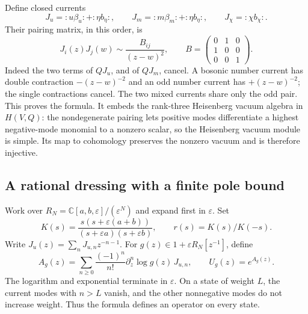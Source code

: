 Define closed currents
\[
 J_u={:}u\beta_u{:}+{:}\eta b_\eta{:},\qquad
 J_m={:}m\beta_m{:}+{:}\eta b_\eta{:},\qquad
 J_\chi={:}\chi b_\chi{:}.
\]
Their pairing matrix, in this order, is
\begin{equation}\label{cyquant:eq:nodal-current-pairing}
 J_i(z)J_j(w)\sim\frac{B_{ij}}{(z-w)^2},\qquad
 B=\begin{pmatrix}0&1&0\\1&0&0\\0&0&1\end{pmatrix}.
\end{equation}
Indeed the two terms of $QJ_u$, and of $QJ_m$, cancel.  A bosonic
number current has double contraction $-(z-w)^{-2}$ and an odd number
current has $+(z-w)^{-2}$; the single contractions cancel.  The two
mixed currents share only the odd pair.  This proves the formula.
It embeds the rank-three Heisenberg vacuum algebra in $H(V,Q)$:
the nondegenerate pairing lets positive modes differentiate a highest
negative-mode monomial to a nonzero scalar, so the Heisenberg vacuum
module is simple.  Its map to cohomology preserves the nonzero vacuum
and is therefore injective.

\subsection{A rational dressing with a finite pole bound}

Work over $R_N=\mathbb C[a,b,\varepsilon]/(\varepsilon^N)$ and expand
first in $\varepsilon$.  Set
\[
 K(s)=\frac{s(s+\varepsilon(a+b))}
              {(s+\varepsilon a)(s+\varepsilon b)},\qquad
 r(s)=K(s)/K(-s).
\]
Write $J_u(z)=\sum_nJ_{u,n}z^{-n-1}$.
For $g(z)\in1+\varepsilon R_N[z^{-1}]$, define
\begin{equation}\label{cyquant:eq:dressing}
 A_g(z)=\sum_{n\geq0}\frac{(-1)^n}{n!}
        \partial_z^n\log g(z)\,J_{u,n},\qquad U_g(z)=e^{A_g(z)}.
\end{equation}
The logarithm and exponential terminate in $\varepsilon$.  On a state
of weight $L$, the current modes with $n>L$ vanish, and the other
nonnegative modes do not increase weight.  Thus the formula defines an
operator on every state.

